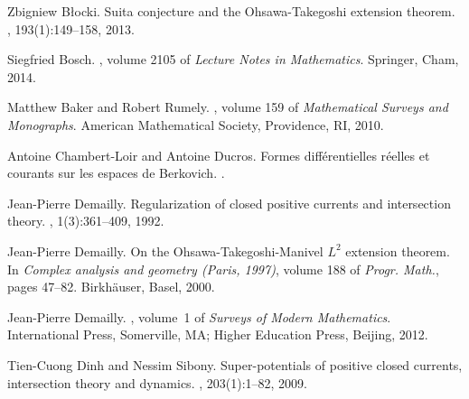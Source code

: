 \documentclass[10pt,reqno]{amsart}
\theoremstyle{plain}
\theoremstyle{definition}
\numberwithin{equation}{section}
\begin{document}
\begin{thebibliography}{BRG84}

Zbigniew B{\l}ocki.
\newblock Suita conjecture and the {O}hsawa-{T}akegoshi extension theorem.
, 193(1):149--158, 2013.

Siegfried Bosch.
, volume 2105 of {\em
  Lecture Notes in Mathematics}.
\newblock Springer, Cham, 2014.

Matthew Baker and Robert Rumely.
, volume 159 of {\em Mathematical Surveys and Monographs}.
\newblock American Mathematical Society, Providence, RI, 2010.

Antoine Chambert-Loir and Antoine Ducros.
\newblock Formes diff{\'e}rentielles r{\'e}elles et courants sur les espaces de
  {B}erkovich.
.

Jean-Pierre Demailly.
\newblock Regularization of closed positive currents and intersection theory.
, 1(3):361--409, 1992.

Jean-Pierre Demailly.
\newblock On the {O}hsawa-{T}akegoshi-{M}anivel {$L^2$} extension theorem.
\newblock In {\em Complex analysis and geometry ({P}aris, 1997)}, volume 188 of
  {\em Progr. Math.}, pages 47--82. Birkh\"auser, Basel, 2000.

Jean-Pierre Demailly.
, volume~1 of {\em
  Surveys of Modern Mathematics}.
\newblock International Press, Somerville, MA; Higher Education Press, Beijing,
  2012.


Tien-Cuong Dinh and Nessim Sibony.
\newblock Super-potentials of positive closed currents, intersection theory and
  dynamics.
, 203(1):1--82, 2009.


\end{thebibliography}
\end{document}
